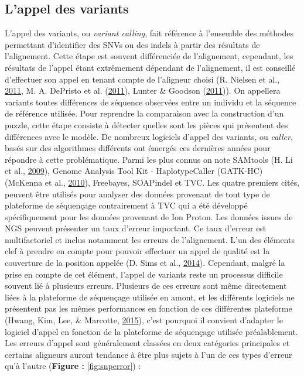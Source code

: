 \documentclass[12pt,twoside]{reedthesis}
\theoremstyle{definition}
\theoremstyle{definition}
\theoremstyle{remark}
\begin{document}
  \subsection{L'appel des variants}\label{lappel-des-variants}
  
  L'appel des variants, ou \emph{variant calling}, fait référence à
  l'ensemble des méthodes permettant d'identifier des SNVs ou des indels à
  partir des résultats de l'alignement. Cette étape est souvent
  différenciée de l'alignement, cependant, les résultats de l'appel étant
  extrêmement dépendant de l'alignement, il est conseillé d'effectuer son
  appel en tenant compte de l'aligneur choisi (R. Nielsen et al.,
  \protect\hyperlink{ref-Nielsen2011}{2011}, M. A. DePristo et al.
  (\protect\hyperlink{ref-DePristo2011}{2011}), Lunter \& Goodson
  (\protect\hyperlink{ref-Lunter2011}{2011})). On appellera variants
  toutes différences de séquence observées entre un individu et la
  séquence de référence utilisée. Pour reprendre la comparaison avec la
  construction d'un puzzle, cette étape consiste à détecter quelles sont
  les pièces qui présentent des différences avec le modèle. De nombreux
  logiciels d'appel des variants, ou \emph{caller}, basés sur des
  algorithmes différents ont émergés ces dernières années pour répondre à
  cette problématique. Parmi les plus connus on note SAMtools (H. Li et
  al., \protect\hyperlink{ref-Li2009}{2009}), Genome Analysis Tool Kit -
  HaplotypeCaller (GATK-HC) (McKenna et al.,
  \protect\hyperlink{ref-McKenna2010}{2010}), Freebayes, SOAPindel et TVC.
  Les quatre premiers cités, peuvent être utilisés pour analyser des
  données provenant de tout type de plateforme de séquençage contrairement
  à TVC qui a été développé spécifiquement pour les données provenant de
  Ion Proton. Les données issues de NGS peuvent présenter un taux d'erreur
  important. Ce taux d'erreur est multifactoriel et inclus notamment les
  erreurs de l'alignement. L'un des éléments clef à prendre en compte pour
  pouvoir effectuer un appel de qualité est la couverture de la position
  appelée (D. Sims et al., \protect\hyperlink{ref-Sims2014}{2014}).
  Cependant, malgré la prise en compte de cet élément, l'appel de variants
  reste un processus difficile souvent lié à plusieurs erreurs. Plusieurs
  de ces erreurs sont même directement liées à la plateforme de séquençage
  utilisée en amont, et les différents logiciels ne présentent pas les
  mêmes performances en fonction de ces différentes plateforme (Hwang,
  Kim, Lee, \& Marcotte, \protect\hyperlink{ref-Hwang2015}{2015}), c'est
  pourquoi il convient d'adapter le logiciel d'appel en fonction de la
  plateforme de séquençage utilisée préalablement. Les erreurs d'appel
  sont généralement classées en deux catégories principales et certains
  aligneurs auront tendance à être plus sujets à l'un de ces types
  d'erreur qu'à l'autre (\textbf{Figure : }\ref{fig:snperror}) :
  
\end{document}

